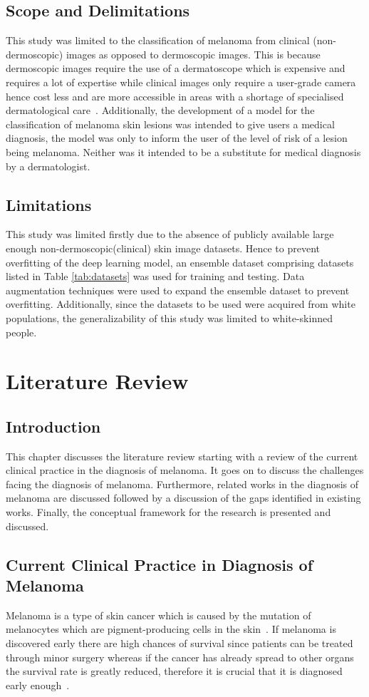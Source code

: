 \documentclass[12pt, a4paper]{article}
\begin{document}
\subsection{Scope and Delimitations}
This study was limited to the classification of melanoma from clinical (non-dermoscopic) images as opposed to dermoscopic images. This is because dermoscopic images require the use of a dermatoscope which is expensive and requires a lot of expertise while clinical images only require a user-grade camera hence cost less and are more accessible in areas with a shortage of specialised dermatological care~\cite{jafari2017extraction}. Additionally, the development of a model for the classification of melanoma skin lesions was intended to give users a medical diagnosis, the model was only to inform the user of the level of risk of a lesion being melanoma. Neither was it intended to be a substitute for medical diagnosis by a dermatologist.
\subsection{Limitations}
This study was limited firstly due to the absence of publicly available large enough non-dermoscopic(clinical) skin image datasets. Hence to prevent overfitting of the deep learning model, an ensemble dataset comprising datasets listed in Table \ref{tab:datasets} was used for training and testing. Data augmentation techniques were used to expand the ensemble dataset to prevent overfitting. Additionally, since the datasets to be used were acquired from white populations, the generalizability of this study was limited to white-skinned people.
\clearpage
\section{Literature Review}
\subsection{Introduction}
This chapter discusses the literature review starting with a review of the current clinical practice in the diagnosis of melanoma. It goes on to discuss the challenges facing the diagnosis of melanoma. Furthermore, related works in the diagnosis of melanoma are discussed followed by a discussion of the gaps identified in existing works. Finally, the conceptual framework for the research is presented and discussed.
\subsection{Current Clinical Practice in Diagnosis of Melanoma}
Melanoma is a type of skin cancer which is caused by the mutation of melanocytes which are pigment-producing cells in the skin~\citep{domingues2018melanoma}. If melanoma is discovered early there are high chances of survival since patients can be treated through minor surgery whereas if the cancer has already spread to other organs the survival rate is greatly reduced, therefore it is crucial that it is diagnosed early enough~\cite{davis2019current}.
\end{document}
